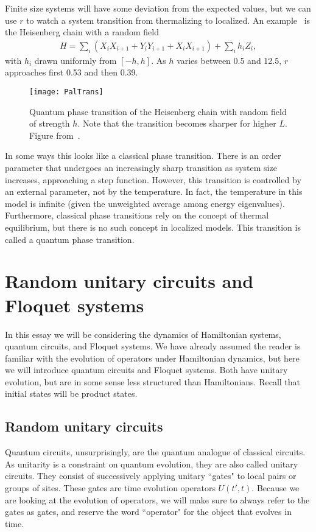 \documentclass[a4paper,11pt]{article}
\begin{document}
Finite size systems will have some deviation from the expected values, but we can use $r$ to watch a system transition from thermalizing to localized. An example~\cite{PalHuse} is the Heisenberg chain with a random field
\begin{align}
H = \sum_i\left(X_iX_{i+1} + Y_iY_{i+1} + X_iX_{i+1}\right)+\sum_i h_iZ_i,
\end{align}
with $h_i$ drawn uniformly from $[-h,h]$. As $h$ varies between 0.5 and 12.5, $r$ approaches first 0.53 and then 0.39. 
\begin{figure}
	\centering
	\texttt{[image: PalTrans]}
	\caption{Quantum phase transition of the Heisenberg chain with random field of strength $h$. Note that the transition becomes sharper for higher $L$. Figure from~\cite{PalHuse}.}
	\label{fig:PalTrans}
\end{figure}
In some ways this looks like a classical phase transition. There is an order parameter that undergoes an increasingly sharp transition as system size increases, approaching a step function. However, this transition is controlled by an external parameter, not by the temperature. In fact, the temperature in this model is infinite (given the unweighted average among energy eigenvalues). Furthermore, classical phase transitions rely on the concept of thermal equilibrium, but there is no such concept in localized models. This transition is called a quantum phase transition.


\section{Random unitary circuits and Floquet systems} \label{sec:circuits}

In this essay we will be considering the dynamics of Hamiltonian systems, quantum circuits, and Floquet systems. We have already assumed the reader is familiar with the evolution of operators under Hamiltonian dynamics, but here we will introduce quantum circuits and Floquet systems. Both have unitary evolution, but are in some sense less structured than Hamiltonians. Recall that initial states will be product states.

\subsection{Random unitary circuits} \label{sub:ruc}

Quantum circuits, unsurprisingly, are the quantum analogue of classical circuits. As unitarity is a constraint on quantum evolution, they are also called unitary circuits. They consist of successively applying unitary ``gates" to local pairs or groups of sites. These gates are time evolution operators $U(t',t)$. Because we are looking at the evolution of operators, we will make sure to always refer to the gates as gates, and reserve the word ``operator" for the object that evolves in time.
\end{document}
